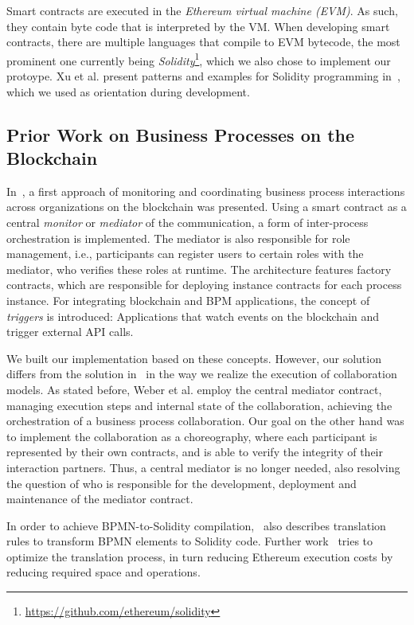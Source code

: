\documentclass[runningheads]{llncs}
\begin{document}
Smart contracts are executed in the \emph{Ethereum virtual machine (EVM)}.
As such, they contain byte code that is interpreted by the VM.
When developing smart contracts, there are multiple languages that compile to EVM bytecode, the most prominent one currently being \emph{Solidity}\footnote{\url{https://github.com/ethereum/solidity}}, which we also chose to implement our protoype.
Xu et al. present patterns and examples for Solidity programming in~\cite{xu2018pattern}, which we used as orientation during development.

\subsection{Prior Work on Business Processes on the Blockchain}
In~\cite{weber2016untrusted}, a first approach of monitoring and coordinating business process interactions across organizations on the blockchain was presented.
Using a smart contract as a central \emph{monitor} or \emph{mediator} of the communication, a form of inter-process orchestration is implemented.
The mediator is also responsible for role management, i.e., participants can register users to certain roles with the mediator, who verifies these roles at runtime.
The architecture features factory contracts, which are responsible for deploying instance contracts for each process instance.
For integrating blockchain and BPM applications, the concept of \emph{triggers} is introduced: Applications that watch events on the blockchain and trigger external API calls.

We built our implementation based on these concepts.
However, our solution differs from the solution in~\cite{weber2016untrusted} in the way we realize the execution of collaboration models.
As stated before, Weber et al. employ the central mediator contract, managing execution steps and internal state of the collaboration, achieving the orchestration of a business process collaboration.
Our goal on the other hand was to implement the collaboration as a choreography, where each participant is represented by their own contracts, and is able to verify the integrity of their interaction partners.
Thus, a central mediator is no longer needed, also resolving the question of who is responsible for the development, deployment and maintenance of the mediator contract.

In order to achieve BPMN-to-Solidity compilation,~\cite{weber2016untrusted} also describes translation rules to transform BPMN elements to Solidity code.
Further work~\cite{banuelos2017optimized} tries to optimize the translation process, in turn reducing Ethereum execution costs by reducing required space and operations.
\end{document}
